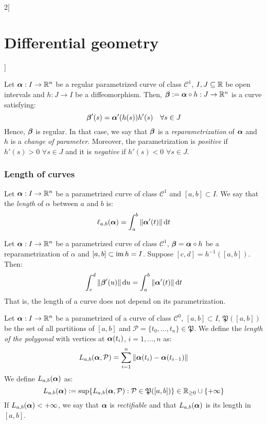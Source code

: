 \documentclass[../../../main.tex]{subfiles}
\begin{document}
\begin{multicols}{2}[\section{Differential geometry}]
\begin{definition}
  \end{definition}
  \begin{definition}
    Let $\boldsymbol{\mathrm{\alpha}}:I\rightarrow\mathbb{R}^n$ be a regular parametrized curve of class $\mathcal{C}^1$, $I,J\subseteq\mathbb{R}$ be open intervals and $h:J\rightarrow I$ be a diffeomorphism. Then, $\boldsymbol{\mathrm{\beta}}:=\boldsymbol{\mathrm{\alpha}}\circ h:J\rightarrow\mathbb{R}^n$ is a curve satisfying: $$\boldsymbol{\mathrm{\beta}}'(s)=\boldsymbol{\mathrm{\alpha}}'(h(s))h'(s)\quad\forall s\in J$$ Hence, $\boldsymbol{\mathrm{\beta}}$ is regular. In that case, we say that $\boldsymbol{\mathrm{\beta}}$ is a \emph{reparametrization} of $\boldsymbol{\mathrm{\alpha}}$ and $h$ is a \emph{change of parameter}. Moreover, the parametrization is \emph{positive} if $h'(s)>0$ $\forall s\in J$ and it is \emph{negative} if $h'(s)<0$ $\forall s\in J$.
  \end{definition}
  \subsubsection{Length of curves}
  \begin{definition}
    Let $\boldsymbol{\mathrm{\alpha}}:I\rightarrow\mathbb{R}^n$ be a parametrized curve of class $\mathcal{C}^1$ and $[a,b]\subset I$. We say that the \emph{length} of $\alpha$ between $a$ and $b$ is: $$\ell_{a,b}(\boldsymbol{\mathrm{\alpha}})=\int_a^b\|\boldsymbol{\mathrm{\alpha}}'(t)\|\dd{t}$$
  \end{definition}
  \begin{proposition}
    Let $\boldsymbol{\mathrm{\alpha}}:I\rightarrow\mathbb{R}^n$ be a parametrized curve of class $\mathcal{C}^1$, $\boldsymbol{\mathrm{\beta}}=\boldsymbol{\mathrm{\alpha}}\circ h$ be a reparametrization of $\alpha$ and $[a,b]\subset \operatorname{im} h=I$. Suppose $[c,d]=h^{-1}([a,b])$. Then: $$\int_c^d\|\boldsymbol{\mathrm{\beta}}'(u)\|\dd{u}=\int_a^b\|\boldsymbol{\mathrm{\alpha}}'(t)\|\dd{t}$$ That is, the length of a curve does not depend on its parametrization.
  \end{proposition}
  \begin{definition}
    Let $\boldsymbol{\mathrm{\alpha}}:I\rightarrow\mathbb{R}^n$ be a parametrized of a curve of class $\mathcal{C}^0$, $[a,b]\subset I$, $\mathfrak{P}([a,b])$ be the set of all partitions of $[a,b]$ and $\mathcal{P}=\{t_0,\ldots,t_n\}\in\mathfrak{P}$. We define the \emph{length of the polygonal} with vertices at $\boldsymbol{\mathrm{\alpha}}(t_i)$, $i=1,\ldots,n$ as: $$L_{a,b}(\boldsymbol{\mathrm{\alpha}},\mathcal{P})=\sum_{i=1}^n\|\boldsymbol{\mathrm{\alpha}}(t_i)-\boldsymbol{\mathrm{\alpha}}(t_{i-1})\|$$ We define $L_{a,b}(\boldsymbol{\mathrm{\alpha}})$ as:
    $$L_{a,b}(\boldsymbol{\mathrm{\alpha}}):=\sup\{L_{a,b}(\boldsymbol{\mathrm{\alpha}},\mathcal{P}):\mathcal{P}\in\mathfrak{P}([a,b])\}\in\mathbb{R}_{\geq 0}\cup\{+\infty\}$$ If $L_{a,b}(\boldsymbol{\mathrm{\alpha}})<+\infty$, we say that $\boldsymbol{\mathrm{\alpha}}$ is \emph{rectifiable} and that $L_{a,b}(\boldsymbol{\mathrm{\alpha}})$ is its length in $[a,b]$.

\end{definition}
\end{multicols}
\end{document}

